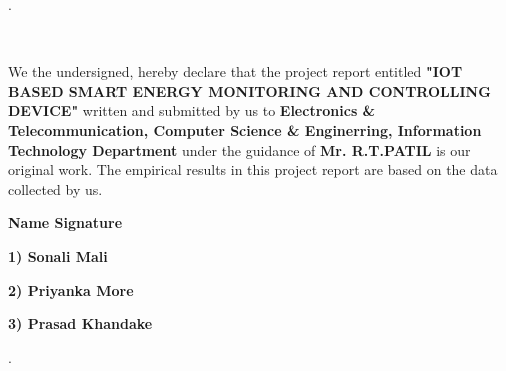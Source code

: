 \documentclass[12pt,a4paper]{article}
\begin{document}

\newpage
\thispagestyle{empty}
\thisfancypage{
   \setlength{\fboxsep}{10pt}\doublebox}{} 
.\\
\vspace{0.4in}
\begin{center}
		\textbf{\large{}}\\
\end{center}
\vspace{0.5cm}
\hspace{1cm}We the undersigned, hereby declare that the project report entitled \textbf{"IOT BASED SMART ENERGY MONITORING AND CONTROLLING DEVICE"} written and submitted by us to \textbf{Electronics
\& Telecommunication, Computer Science \& Enginerring, Information Technology Department} under the guidance of \textbf{ Mr. R.T.PATIL} is our original work. The empirical results in this project report are based on the data collected by us. \\ 

\vspace{0.5cm}

\textbf{ \hspace{2cm}Name \hspace{5cm} Signature \\ }

\textbf{ \hspace{1cm}1) Sonali Mali\hspace{4.5cm} \\ }

\textbf{ \hspace{1cm}2) Priyanka More\hspace{3.7cm} \\ }

\textbf{ \hspace{1cm}3) Prasad Khandake\hspace{3.2cm} \\ }
\vspace{0.1in}


\newpage
\thispagestyle{empty}
\thisfancypage{
   \setlength{\fboxsep}{10pt}\fbox}{} 
.\\

\begin{center}
		\textbf{\large{}}\\
\end{center}
\end{document}
